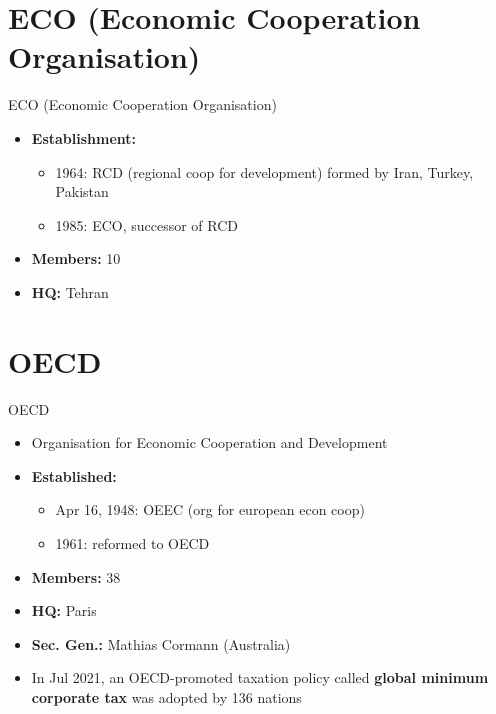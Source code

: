 \documentclass[
  12pt,
  ignorenonframetext,
  progressbar=frametitle]{beamer}
\providecommand{\tightlist}{%
  \setlength{\itemsep}{0pt}\setlength{\parskip}{0pt}}
\begin{document}
\section{ECO (Economic Cooperation Organisation)}
\begin{frame}[allowframebreaks]
{ECO (Economic Cooperation Organisation)}
\protect\hypertarget{eco-economic-cooperation-organisation}{}
\begin{itemize}
\tightlist
\item
  \textbf{Establishment:}

  \begin{itemize}
  \tightlist
  \item
    1964: RCD (regional coop for development) formed by Iran, Turkey,
    Pakistan
  \item
    1985: ECO, successor of RCD
  \end{itemize}
\item
  \textbf{Members:} 10
\item
  \textbf{HQ:} Tehran
\end{itemize}
\end{frame}

\section{OECD}
\begin{frame}[allowframebreaks]
{OECD}
\protect\hypertarget{oecd}{}
\begin{itemize}
\tightlist
\item
  Organisation for Economic Cooperation and Development
\item
  \textbf{Established:}

  \begin{itemize}
  \tightlist
  \item
    Apr 16, 1948: OEEC (org for european econ coop)
  \item
    1961: reformed to OECD
  \end{itemize}
\item
  \textbf{Members:} 38
\item
  \textbf{HQ:} Paris
\item
  \textbf{Sec. Gen.:} Mathias Cormann (Australia)
\item
  In Jul 2021, an OECD-promoted taxation policy called \textbf{global
  minimum corporate tax} was adopted by 136 nations
\end{itemize}
\end{frame}
\end{document}
